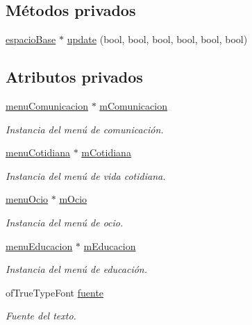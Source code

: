 \subsection*{Métodos privados}
\begin{DoxyCompactItemize}
\item 
\hyperlink{classespacio_base}{espacio\+Base} $\ast$ \hyperlink{classmenu_principal_a9855069f896926a6e6abace2f30e804e}{update} (bool, bool, bool, bool, bool, bool)
\end{DoxyCompactItemize}
\subsection*{Atributos privados}
\begin{DoxyCompactItemize}
\item 
\hyperlink{classmenu_comunicacion}{menu\+Comunicacion} $\ast$ \hyperlink{classmenu_principal_af820d04d0e35fa1f4c552af95d5e3036}{m\+Comunicacion}
\begin{DoxyCompactList}\small\item\em Instancia del menú de comunicación. \end{DoxyCompactList}\item 
\hyperlink{classmenu_cotidiana}{menu\+Cotidiana} $\ast$ \hyperlink{classmenu_principal_a67ce856e4bf6566b0e2dc4f6c1471e19}{m\+Cotidiana}
\begin{DoxyCompactList}\small\item\em Instancia del menú de vida cotidiana. \end{DoxyCompactList}\item 
\hyperlink{classmenu_ocio}{menu\+Ocio} $\ast$ \hyperlink{classmenu_principal_a8e372431b14d13de965f84dc0593e08a}{m\+Ocio}
\begin{DoxyCompactList}\small\item\em Instancia del menú de ocio. \end{DoxyCompactList}\item 
\hyperlink{classmenu_educacion}{menu\+Educacion} $\ast$ \hyperlink{classmenu_principal_a495c578e5fba7f2453f963e88c193b5d}{m\+Educacion}
\begin{DoxyCompactList}\small\item\em Instancia del menú de educación. \end{DoxyCompactList}\item 
of\+True\+Type\+Font \hyperlink{classmenu_principal_a23f1de2b0d66522eae4ce63763d31ce6}{fuente}
\begin{DoxyCompactList}\small\item\em Fuente del texto. \end{DoxyCompactList}\item 

\end{DoxyCompactItemize}

